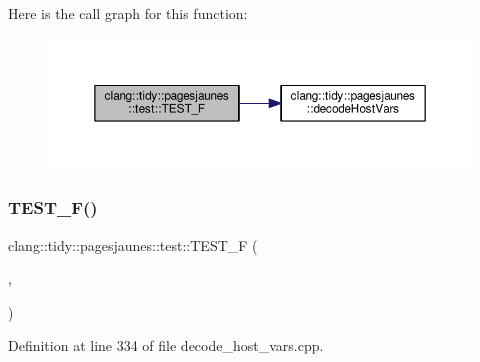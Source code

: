 Here is the call graph for this function\+:
\nopagebreak
\begin{figure}[H]
\begin{center}
\leavevmode
\includegraphics[width=350pt]{namespaceclang_1_1tidy_1_1pagesjaunes_1_1test_ad227042216e1a35a4bc01881f7b764a5_cgraph}
\end{center}
\end{figure}
\mbox{\label{namespaceclang_1_1tidy_1_1pagesjaunes_1_1test_a4152664c7bb07378827d7cb3d4863daf}} 
\subsubsection{\texorpdfstring{T\+E\+S\+T\+\_\+\+F()}{TEST\_F()}\hspace{0.1cm}{\footnotesize\ttfamily [52/57]}}
{\footnotesize\ttfamily clang\+::tidy\+::pagesjaunes\+::test\+::\+T\+E\+S\+T\+\_\+F (\begin{DoxyParamCaption}\item[{\hyperlink{classclang_1_1tidy_1_1pagesjaunes_1_1test_1_1_decode_host_vars_test}{Decode\+Host\+Vars\+Test}}]{,  }\item[{Decode\+Host\+Vars\+Basic\+With\+Indicators}]{ }\end{DoxyParamCaption})}



Definition at line 334 of file decode\+\_\+host\+\_\+vars.\+cpp.

